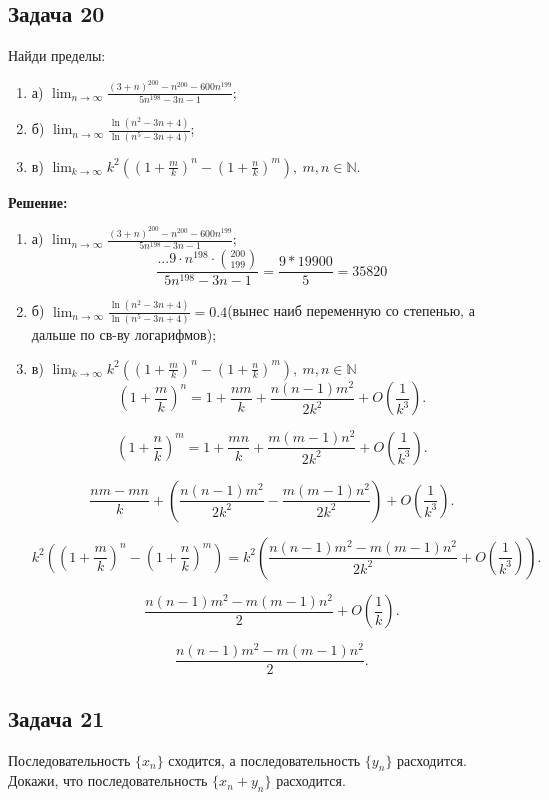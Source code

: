 \documentclass[a4paper,12pt]{article}
\begin{document}
\subsection{Задача 20}
Найди пределы:
\begin{enumerate}
    \item а) $\lim_{n \to \infty} \frac{(3+n)^{200} - n^{200} - 600n^{199}}{5n^{198} - 3n - 1}$;
    \item б) $\lim_{n \to \infty} \frac{\ln(n^2 - 3n + 4)}{\ln(n^5 - 3n + 4)}$;
    \item в) $\lim_{k \to \infty} k^2 \left((1 + \frac{m}{k})^n - (1 + \frac{n}{k})^m\right), \ m, n \in \mathbb{N}$.
\end{enumerate}
\textbf{Решение:}
\begin{enumerate}
    \item а) $\lim_{n \to \infty} \frac{(3+n)^{200} - n^{200} - 600n^{199}}{5n^{198} - 3n - 1}$;
    \[
    \frac{...9\cdot n^{198} \cdot \binom{200}{199}}{5n^{198}-3n-1} = \frac{9*19900}{5}=35820
    \]
    
    \item б) $\lim_{n \to \infty} \frac{\ln(n^2 - 3n + 4)}{\ln(n^5 - 3n + 4)}=0.4$(вынес наиб переменную со степенью, а дальше по св-ву логарифмов);
    
    \item в) $\lim_{k \to \infty} k^2 \left((1 + \frac{m}{k})^n - (1 + \frac{n}{k})^m\right), \ m, n \in \mathbb{N}$
   \[
   (1 + \frac{m}{k})^n = 1 + \frac{nm}{k} + \frac{n(n-1)m^2}{2k^2} + O\left(\frac{1}{k^3}\right).
   \]

   \[
   (1 + \frac{n}{k})^m = 1 + \frac{mn}{k} + \frac{m(m-1)n^2}{2k^2} + O\left(\frac{1}{k^3}\right).
   \]

    \[
    \frac{nm - mn}{k} + \left(\frac{n(n-1)m^2}{2k^2} - \frac{m(m-1)n^2}{2k^2}\right) + O\left(\frac{1}{k^3}\right).
    \]

    \[
    k^2 \left((1 + \frac{m}{k})^n - (1 + \frac{n}{k})^m\right) = k^2 \left(\frac{n(n-1)m^2 - m(m-1)n^2}{2k^2} + O\left(\frac{1}{k^3}\right)\right).
    \]

    \[
    \frac{n(n-1)m^2 - m(m-1)n^2}{2} + O\left(\frac{1}{k}\right).
    \]

    \[
    \frac{n(n-1)m^2 - m(m-1)n^2}{2}.
    \]
\end{enumerate}

\subsection{Задача 21}
Последовательность $\{x_n\}$ сходится, а последовательность $\{y_n\}$ расходится. Докажи, что последовательность $\{x_n + y_n\}$ расходится.
\end{document}
